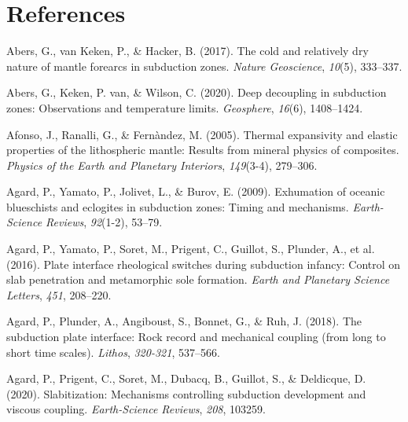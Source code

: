 \cleardoublepage

\hypertarget{references}{%
\chapter*{References}\label{references}}


\hypertarget{refs_main}{}
\begin{CSLReferences}{1}{1}
\leavevmode{}%
Abers, G., van Keken, P., \& Hacker, B. (2017). The cold and relatively dry nature of mantle forearcs in subduction zones. \emph{Nature Geoscience}, \emph{10}(5), 333--337.

\leavevmode{}%
Abers, G., Keken, P. van, \& Wilson, C. (2020). Deep decoupling in subduction zones: Observations and temperature limits. \emph{Geosphere}, \emph{16}(6), 1408--1424.

\leavevmode{}%
Afonso, J., Ranalli, G., \& Fernàndez, M. (2005). Thermal expansivity and elastic properties of the lithospheric mantle: Results from mineral physics of composites. \emph{Physics of the Earth and Planetary Interiors}, \emph{149}(3-4), 279--306.

\leavevmode{}%
Agard, P., Yamato, P., Jolivet, L., \& Burov, E. (2009). Exhumation of oceanic blueschists and eclogites in subduction zones: Timing and mechanisms. \emph{Earth-Science Reviews}, \emph{92}(1-2), 53--79.

\leavevmode{}%
Agard, P., Yamato, P., Soret, M., Prigent, C., Guillot, S., Plunder, A., et al. (2016). Plate interface rheological switches during subduction infancy: Control on slab penetration and metamorphic sole formation. \emph{Earth and Planetary Science Letters}, \emph{451}, 208--220.

\leavevmode{}%
Agard, P., Plunder, A., Angiboust, S., Bonnet, G., \& Ruh, J. (2018). The subduction plate interface: Rock record and mechanical coupling (from long to short time scales). \emph{Lithos}, \emph{320-321}, 537--566.

\leavevmode{}%
Agard, P., Prigent, C., Soret, M., Dubacq, B., Guillot, S., \& Deldicque, D. (2020). Slabitization: Mechanisms controlling subduction development and viscous coupling. \emph{Earth-Science Reviews}, \emph{208}, 103259.


\end{CSLReferences}
